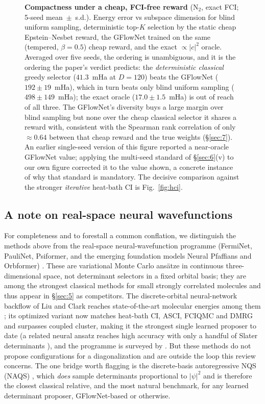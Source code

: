\documentclass[11pt]{article}
\begin{document}
\begin{figure}[tb]
\caption{\textbf{Compactness under a cheap, FCI-free reward} (N$_2$, exact FCI; 5-seed mean~$\pm$~s.d.). Energy error vs subspace dimension for blind uniform sampling, deterministic top-$K$ selection by the static cheap Epstein--Nesbet reward, the GFlowNet trained on the same (tempered, $\beta{=}0.5$) cheap reward, and the exact $\propto|c|^2$ oracle. Averaged over five seeds, the ordering is unambiguous, and it is the ordering the paper's verdict predicts: the \emph{deterministic classical} greedy selector ($41.3$~mHa at $D{=}120$) beats the GFlowNet ($192\pm19$~mHa), which in turn beats only blind uniform sampling ($498\pm149$~mHa); the exact oracle ($17.0\pm1.5$~mHa) is out of reach of all three. The GFlowNet's diversity buys a large margin over blind sampling but none over the cheap classical selector it shares a reward with, consistent with the Spearman rank correlation of only ${\approx}0.64$ between that cheap reward and the true weights (\S\ref{sec:7}). An earlier single-seed version of this figure reported a near-oracle GFlowNet value; applying the multi-seed standard of \S\ref{sec:6}(v) to our own figure corrected it to the value shown, a concrete instance of why that standard is mandatory. The decisive comparison against the stronger \emph{iterative} heat-bath CI is Fig.~\ref{fig:hci}.}
\label{fig:compact}
\end{figure}


\subsection{A note on real-space neural wavefunctions}\label{sec:4-7}

For completeness and to forestall a common conflation, we distinguish the methods above from the real-space neural-wavefunction programme (FermiNet, PauliNet, Psiformer, and the emerging foundation models Neural Pfaffians and Orbformer) \cite{pfau2020,hermann2020,vonglehn2023,gao2024,foster2025}. These are variational Monte Carlo ans\"atze in continuous three-dimensional space, not determinant selectors in a fixed orbital basis; they are among the strongest classical methods for small strongly correlated molecules and thus appear in \S\ref{sec:5} as competitors. The discrete-orbital neural-network backflow of Liu and Clark reaches state-of-the-art molecular energies among them \cite{liuclark2024}; its optimized variant now matches heat-bath CI, ASCI, FCIQMC and DMRG and surpasses coupled cluster, making it the strongest single learned proposer to date \cite{liuclark2025} (a related neural ansatz reaches high accuracy with only a handful of Slater determinants \cite{fewdet2026}), and the programme is surveyed by \cite{hermann2023}. But these methods do not propose configurations for a diagonalization and are outside the loop this review concerns. The one bridge worth flagging is the discrete-basis autoregressive NQS (NAQS) \cite{barrett2022}, which \emph{does} sample determinants proportional to $|\psi|^2$ and is therefore the closest classical relative, and the most natural benchmark, for any learned determinant proposer, GFlowNet-based or otherwise.
\end{document}
